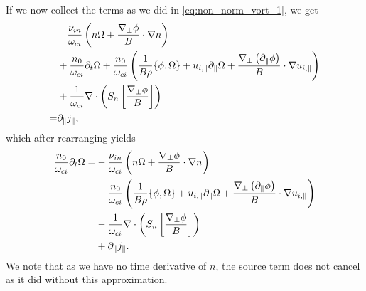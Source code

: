 %
If we now collect the terms as we did in \cref{eq:non_norm_vort_1}, we get
%
\begin{align*}
  &
  \quad
 \frac{\nu_{in}}{\omega_{ci}} \left(n\Omega + \frac{\nabla_\perp \phi}{B} \cdot \nabla n\right)
  \\
 &
 + \frac{n_0}{\omega_{ci}}\partial_t\Omega
 + \frac{n_0}{\omega_{ci}}
 \left(
 \frac{1}{B\rho}\{\phi, \Omega\}
 + u_{i,\|}\partial_\|\Omega
 + \frac{\nabla_\perp\left( \partial_\|\phi\right)}{B}\cdot\nabla u_{i,\|}
 \right)
 \\
 &
 + \frac{1}{\omega_{ci}}
    \nabla\cdot \left( S_n \left[ \frac{ \nabla_\perp \phi }{ B } \right] \right)
 \\
 =&
 \partial_\| j_\|,
\end{align*}
%
which after rearranging yields
%
\begin{align*}
 \frac{n_0}{\omega_{ci}}\partial_t\Omega
 =&
 - \frac{\nu_{in}}{\omega_{ci}} \left(n\Omega + \frac{\nabla_\perp \phi}{B} \cdot \nabla n\right)
  \\
 &- \frac{n_0}{\omega_{ci}}
 \left( \frac{1}{B\rho}\{\phi, \Omega\}
    + u_{i,\|}\partial_\|\Omega
    + \frac{\nabla_\perp\left( \partial_\|\phi\right)}{B}\cdot\nabla u_{i,\|}
 \right)
 \\
 &
 - \frac{1}{\omega_{ci}}
    \nabla\cdot \left( S_n \left[ \frac{ \nabla_\perp \phi }{ B } \right] \right)
 \\
 &
 + \partial_\| j_\|.
\end{align*}
%
We note that as we have no time derivative of $n$, the source term does not cancel as it did without this approximation.
%

